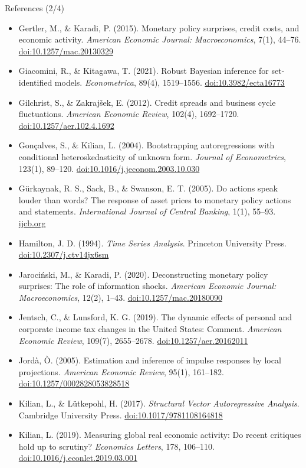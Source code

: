 \begin{frame}{References (2/4)}
\itemsize{\tiny}
\begin{itemize}
    \item Gertler, M., \& Karadi, P. (2015). Monetary policy surprises, credit costs, and economic activity. \textit{American Economic Journal: Macroeconomics}, 7(1), 44--76. \href{https://doi.org/10.1257/mac.20130329}{doi:10.1257/mac.20130329}
    \item Giacomini, R., \& Kitagawa, T. (2021). Robust Bayesian inference for set-identified models. \textit{Econometrica}, 89(4), 1519--1556. \href{https://doi.org/10.3982/ecta16773}{doi:10.3982/ecta16773}
    \item Gilchrist, S., \& Zakrajšek, E. (2012). Credit spreads and business cycle fluctuations. \textit{American Economic Review}, 102(4), 1692--1720. \href{https://doi.org/10.1257/aer.102.4.1692}{doi:10.1257/aer.102.4.1692}
    \item Gonçalves, S., \& Kilian, L. (2004). Bootstrapping autoregressions with conditional heteroskedasticity of unknown form. \textit{Journal of Econometrics}, 123(1), 89--120. \href{https://doi.org/10.1016/j.jeconom.2003.10.030}{doi:10.1016/j.jeconom.2003.10.030}
    \item Gürkaynak, R. S., Sack, B., \& Swanson, E. T. (2005). Do actions speak louder than words? The response of asset prices to monetary policy actions and statements. \textit{International Journal of Central Banking}, 1(1), 55--93. \href{https://www.ijcb.org/journal/ijcb05q2a2.htm}{ijcb.org}
    \item Hamilton, J. D. (1994). \textit{Time Series Analysis}. Princeton University Press. \href{https://doi.org/10.2307/j.ctv14jx6sm}{doi:10.2307/j.ctv14jx6sm}
    \item Jarociński, M., \& Karadi, P. (2020). Deconstructing monetary policy surprises: The role of information shocks. \textit{American Economic Journal: Macroeconomics}, 12(2), 1--43. \href{https://doi.org/10.1257/mac.20180090}{doi:10.1257/mac.20180090}
    \item Jentsch, C., \& Lunsford, K. G. (2019). The dynamic effects of personal and corporate income tax changes in the United States: Comment. \textit{American Economic Review}, 109(7), 2655--2678. \href{https://doi.org/10.1257/aer.20162011}{doi:10.1257/aer.20162011}
    \item Jordà, Ò. (2005). Estimation and inference of impulse responses by local projections. \textit{American Economic Review}, 95(1), 161--182. \href{https://doi.org/10.1257/0002828053828518}{doi:10.1257/0002828053828518}
    \item Kilian, L., \& Lütkepohl, H. (2017). \textit{Structural Vector Autoregressive Analysis}. Cambridge University Press. \href{https://doi.org/10.1017/9781108164818}{doi:10.1017/9781108164818}
    \item Kilian, L. (2019). Measuring global real economic activity: Do recent critiques hold up to scrutiny? \textit{Economics Letters}, 178, 106--110. \href{https://doi.org/10.1016/j.econlet.2019.03.001}{doi:10.1016/j.econlet.2019.03.001}
\end{itemize}
\end{frame}


